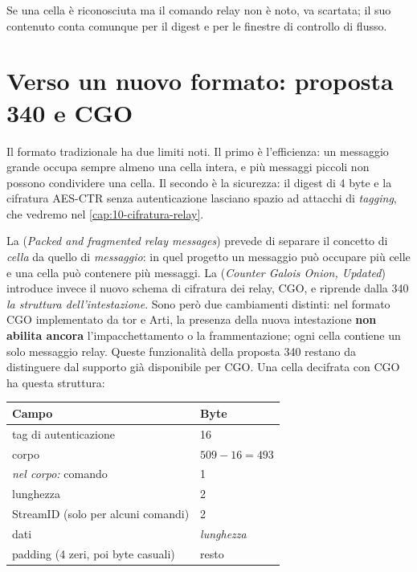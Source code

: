 Se una cella è riconosciuta ma il comando relay non è noto, va scartata; il suo contenuto conta comunque per il digest e per le finestre di controllo di flusso.

\section{Verso un nuovo formato: proposta 340 e CGO}\label{sec:nuovo-formato}

Il formato tradizionale ha due limiti noti. Il primo è l'efficienza: un messaggio grande occupa sempre almeno una cella intera, e più messaggi piccoli non possono condividere una cella. Il secondo è la sicurezza: il digest di 4 byte e la cifratura AES-CTR senza autenticazione lasciano spazio ad attacchi di \emph{tagging}, che vedremo nel \cref{cap:10-cifratura-relay}.

La  (\emph{Packed and fragmented relay messages}) prevede di separare il concetto di \emph{cella} da quello di \emph{messaggio}: in quel progetto un messaggio può occupare più celle e una cella può contenere più messaggi. La  (\emph{Counter Galois Onion, Updated}) introduce invece il nuovo schema di cifratura dei relay, CGO, e riprende dalla 340 \emph{la struttura dell'intestazione}. Sono però due cambiamenti distinti: nel formato CGO implementato da tor e Arti, la presenza della nuova intestazione \textbf{non abilita ancora} l'impacchettamento o la frammentazione; ogni cella contiene un solo messaggio relay. Queste funzionalità della proposta 340 restano da distinguere dal supporto già disponibile per CGO. Una cella decifrata con CGO ha questa struttura:

\begin{center}
\begin{tabular}{ll}
\toprule
Campo & Byte \\
\midrule
tag di autenticazione & 16 \\
corpo & $509 - 16 = 493$ \\
\midrule
\quad \emph{nel corpo:} comando & 1 \\
\quad lunghezza & 2 \\
\quad StreamID (solo per alcuni comandi) & 2 \\
\quad dati & \emph{lunghezza} \\
\quad padding (4 zeri, poi byte casuali) & resto \\
\bottomrule
\end{tabular}
\end{center}

